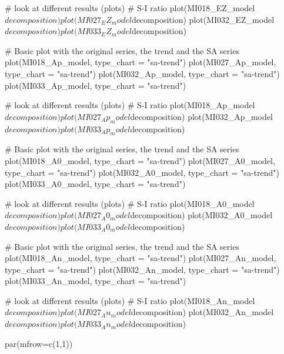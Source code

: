 \begin{lstlinsting}
# look at different results (plots)
# S-I ratio
plot(MI018_EZ_model$decomposition)
plot(MI027_EZ_model$decomposition)
plot(MI032_EZ_model$decomposition)
plot(MI033_EZ_model$decomposition)


# Basic plot with the original series, the trend and the SA series
plot(MI018_Ap_model, type_chart = "sa-trend")
plot(MI027_Ap_model, type_chart = "sa-trend")
plot(MI032_Ap_model, type_chart = "sa-trend")
plot(MI033_Ap_model, type_chart = "sa-trend")

# look at different results (plots)
# S-I ratio
plot(MI018_Ap_model$decomposition)
plot(MI027_Ap_model$decomposition)
plot(MI032_Ap_model$decomposition)
plot(MI033_Ap_model$decomposition)


# Basic plot with the original series, the trend and the SA series
plot(MI018_A0_model, type_chart = "sa-trend")
plot(MI027_A0_model, type_chart = "sa-trend")
plot(MI032_A0_model, type_chart = "sa-trend")
plot(MI033_A0_model, type_chart = "sa-trend")

# look at different results (plots)
# S-I ratio
plot(MI018_A0_model$decomposition)
plot(MI027_A0_model$decomposition)
plot(MI032_A0_model$decomposition)
plot(MI033_A0_model$decomposition)


# Basic plot with the original series, the trend and the SA series
plot(MI018_An_model, type_chart = "sa-trend")
plot(MI027_An_model, type_chart = "sa-trend")
plot(MI032_An_model, type_chart = "sa-trend")
plot(MI033_An_model, type_chart = "sa-trend")

# look at different results (plots)
# S-I ratio
plot(MI018_An_model$decomposition)
plot(MI027_An_model$decomposition)
plot(MI032_An_model$decomposition)
plot(MI033_An_model$decomposition)


par(mfrow=c(1,1))

\end{lstlinsting}
